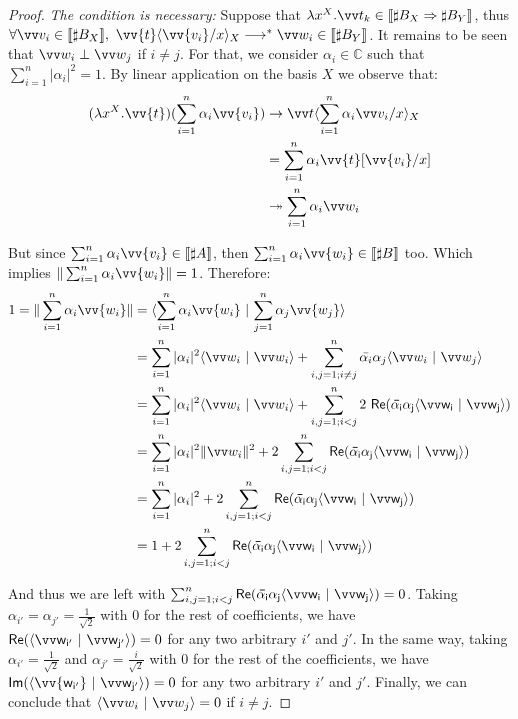 \documentclass[runningheads,orivec,envcountsame,envcountsect]{llncs}
\newcommand\Rpart[1]{\mathsf{Re(#1)}}
\newcommand\Ipart[1]{\mathsf{Im(#1)}}
\newcommand\lra{\longrightarrow}
\newcommand\ansubst[2]{\ensuremath{\langle #1 \rangle_{#2}}}
\def\C{\mathbb{C}}            %
\def\scal#1#2{\langle{#1}~|~{#2}\rangle}
\def\Lam#1#2#3{\lambda#1^{#2}{.}#3} %
\def\eval{\lra^*}
\def\Arr{\Rightarrow}
\def\sem#1{\llbracket#1\rrbracket}
\newcommand\basis[1]{\ensuremath{B_{ #1 }}}
\begin{document}
\begin{proof}
  \textit{The condition is necessary:} Suppose that $\Lam{x}{X}{\vv t_k}\in\sem{\sharp\basis{X}\Arr\sharp\basis{Y}}$, thus $\forall \vv v_i\in\sem{\sharp\basis{X}},\ \vv{t}\ansubst{\vv{v_i}/x}{X}\eval\vv w_i\in\sem{\sharp\basis{Y}}$. It remains to be seen that $\vv w_i \perp \vv w_j$ if $i\neq j$. For that, we consider $\alpha_i\in\C$ such that $\sum_{i=1}^n |\alpha_i|^2 = 1$. By linear application on the basis $X$ we observe that:
  \begin{align*}
    (\Lam{x}{X}{\vv{t}})(\sum_{i=1}^n \alpha_i \vv{v_i}) &\to \vv t\ansubst{\sum_{i=1}^n \alpha_i \vv v_i/x}{X}\\
    &= \sum_{i=1}^{n} \alpha_i \vv{t}[\vv{v_i}/x]\\ 
    &\twoheadrightarrow \sum_{i=1}^n \alpha_i \vv w_i
  \end{align*}

  But since $\sum_{i=1}^n \alpha_i \vv{v_i}\in\sem{\sharp A}$, then $\sum_{i=1}^n \alpha_i \vv{w_i}\in\sem{\sharp B}$ too. Which implies $\|\sum_{i=1}^n \alpha_i \vv{w_i}\|=1$. Therefore:
  \begin{align*}
    1 = \|\sum_{i=1}^n \alpha_i \vv{w_i}\| &= \scal{\sum_{i=1}^n \alpha_i \vv{w_i}}{\sum_{j=1}^n \alpha_j \vv{w_j}}\\
    &=\sum_{i=1}^n |\alpha_i|^2 \scal{\vv w_i}{\vv w_i } + \sum_{i,j=1; i\neq j}^n \bar{\alpha_i}\alpha_j \scal{\vv w_i}{\vv w_j}\\
    &=\sum_{i=1}^n |\alpha_i|^2 \scal{\vv w_i}{\vv w_i } + \sum_{i,j=1; i<j}^n 2~\Rpart{\bar{\alpha_i}\alpha_j \scal{\vv w_i}{\vv w_j}}\\
    &=\sum_{i=1}^n |\alpha_i|^2 \|\vv w_i\|^2 + 2\sum_{i,j=1; i<j}^n \Rpart{\bar{\alpha_i}\alpha_j \scal{\vv w_i}{\vv w_j}}\\
    &=\sum_{i=1}^n |\alpha_i|^2 + 2\sum_{i,j=1; i<j}^n\Rpart{\bar{\alpha_i}\alpha_j \scal{\vv w_i}{\vv w_j}}\\
    &= 1 + 2\sum_{i,j=1; i<j}^n \Rpart{\bar{\alpha_i}\alpha_j \scal{\vv w_i}{\vv w_j}}
  \end{align*}

  And thus we are left with $\sum_{i,j=1; i<j}^n \Rpart{\bar{\alpha_i}\alpha_j \scal{\vv w_i}{\vv w_j}} = 0$. Taking $\alpha_{i'} = \alpha_{j'} = \frac{1}{\sqrt{2}}$ with $0$ for the rest of coefficients, we have $\Rpart{\scal{\vv w_{i'}}{\vv w_{j'}}} = 0$ for any two arbitrary $i'$ and $j'$. In the same way, taking $\alpha_{i'} = \frac{1}{\sqrt{2}}$ and $\alpha_{j'}=\frac{i}{\sqrt{2}}$ with $0$ for the rest of the coefficients, we have $\Ipart{\scal{\vv{w_{i'}}}{\vv w_{j'}}} = 0$ for any two arbitrary $i'$ and $j'$. Finally, we can conclude that $\scal{\vv w_i}{\vv w_j}=0$ if $i\neq j$.


\end{proof}
\end{document}
